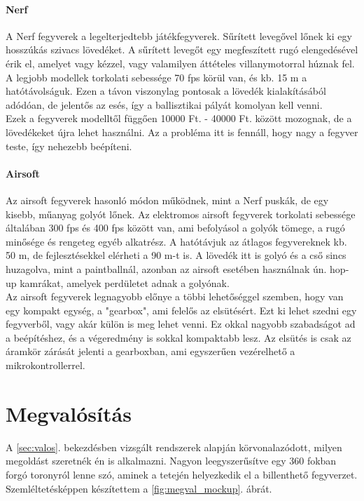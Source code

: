 \documentclass[12pt,a4paper]{article}
\begin{document}
\paragraph{Nerf}

A Nerf fegyverek a legelterjedtebb játékfegyverek. Sűrített levegővel lőnek ki egy hosszúkás szivacs lövedéket. A sűrített levegőt egy megfeszített rugó elengedésével érik el, amelyet vagy kézzel, vagy valamilyen áttételes villanymotorral húznak fel. A legjobb modellek torkolati sebessége 70 fps körül van, és kb. 15 m a hatótávolságuk. Ezen a távon viszonylag pontosak a lövedék kialakításából adódóan, de jelentős az esés, így a ballisztikai pályát komolyan kell venni. \\

Ezek a fegyverek modelltől függően 10000 Ft. - 40000 Ft. között mozognak, de a lövedékeket újra lehet használni. Az a probléma itt is fennáll, hogy nagy a fegyver teste, így nehezebb beépíteni. 

\paragraph{Airsoft}

Az airsoft fegyverek hasonló módon működnek, mint a Nerf puskák, de egy kisebb, műanyag golyót lőnek. Az elektromos airsoft fegyverek torkolati sebessége általában 300 fps és 400 fps között van, ami befolyásol a golyók tömege, a rugó minősége és rengeteg egyéb alkatrész. A hatótávjuk az átlagos fegyvereknek kb. 50 m, de fejlesztésekkel elérheti a 90 m-t is. A lövedék itt is golyó és a cső sincs huzagolva, mint a paintballnál, azonban az airsoft esetében használnak ún. hop-up kamrákat, amelyek perdületet adnak a golyónak.\\

Az airsoft fegyverek legnagyobb előnye a többi lehetőséggel szemben, hogy van egy kompakt egység, a "gearbox", ami felelős az elsütésért. Ezt ki lehet szedni egy fegyverből, vagy akár külön is meg lehet venni. Ez okkal nagyobb szabadságot ad a beépítéshez, és a végeredmény is sokkal kompaktabb lesz. Az elsütés is csak az áramkör zárását jelenti a gearboxban, ami egyszerűen vezérelhető a mikrokontrollerrel.



\section{Megvalósítás}

A \ref{sec:valos}. bekezdésben vizsgált rendszerek alapján körvonalazódott, milyen megoldást szeretnék én is alkalmazni. Nagyon leegyszerűsítve egy 360 fokban forgó toronyról lenne szó, aminek a tetején helyezkedik el a billenthető fegyverzet. Szemléltetésképpen készítettem a \ref{fig:megval_mockup}. ábrát. 
\end{document}
